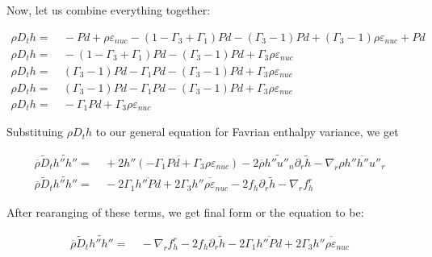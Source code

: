 \documentclass[10pt,paper=a4]{report}
\newcommand{\eht}{\overline}
\newcommand{\fht}{\widetilde}
\begin{document}
\noindent
Now, let us combine everything together:

\begin{align}
  \rho D_t h = & \ - P d + \rho \varepsilon_{nuc} - (1-\Gamma_3+\Gamma_1)Pd - (\Gamma_3 -1)P d + (\Gamma_3-1)\rho \varepsilon_{nuc} + P d \\
  \rho D_t h = & \ - (1-\Gamma_3+\Gamma_1)Pd - (\Gamma_3 -1)P d + \Gamma_3 \rho \varepsilon_{nuc} \\
  \rho D_t h = & \ (\Gamma_3 -1)Pd - \Gamma_1 P d - (\Gamma_3-1)Pd + \Gamma_3 \rho \varepsilon_{nuc} \\
  \rho D_t h = & \ (\Gamma_3 -1)Pd - \Gamma_1 P d - (\Gamma_3-1)Pd + \Gamma_3 \rho \varepsilon_{nuc} \\
\rho D_t h = & \ -\Gamma_1 P d + \Gamma_3 \rho \varepsilon_{nuc}  
\end{align}  

\noindent
Substituing $\rho D_t h$ to our general equation for Favrian enthalpy variance, we get

\begin{align}
  \eht{\rho} \fht{D}_t \fht{h''h''} = & \ +\eht{2 h''(-\Gamma_1 P d + \Gamma_3 \rho \varepsilon_{nuc} )} - 2 \eht{\rho} \fht{h''u''_n}\partial_r \fht{h} - \nabla_r \eht{\rho h''h''u''_r} \\
   \eht{\rho} \fht{D}_t \fht{h''h''} = & \ -2\Gamma_1 \eht{h'' P d} + 2\Gamma_3 \eht{h'' \rho \varepsilon_{nuc}} - 2 f_h \partial_r \fht{h} - \nabla_r f_h^r
\end{align}

\noindent
After rearanging of these terms, we get final form or the equation to be:

\begin{align}
 \eht{\rho} \fht{D}_t \fht{h''h''} = & \ - \nabla_r f_h^r - 2 f_h \partial_r \fht{h} - 2\Gamma_1 \eht{h'' P d} + 2\Gamma_3 \eht{h'' \rho \varepsilon_{nuc}}
\end{align}
  




\end{document}

